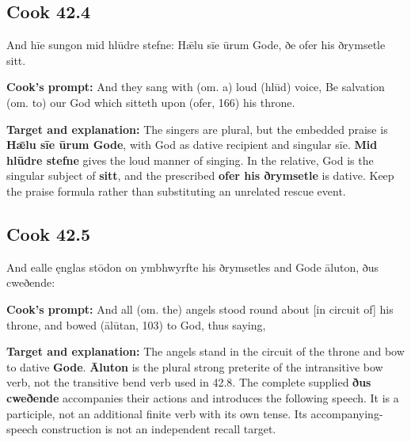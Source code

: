 \par\begin{minipage}{\linewidth}\raggedright
\subsection*{Cook 42.4}

And hīe sungon mid hlūdre stefne: Hǣlu sīe ūrum Gode, ðe ofer his ðrymsetle sitt.

\textbf{Cook's prompt:} And they sang with (om. a) loud (hlūd) voice, Be salvation (om. to) our God which sitteth upon (ofer, 166) his throne.

\textbf{Target and explanation:} The singers are plural, but the embedded praise is \textbf{Hǣlu sīe ūrum Gode}, with God as dative recipient and singular sīe. \textbf{Mid hlūdre stefne} gives the loud manner of singing. In the relative, God is the singular subject of \textbf{sitt}, and the prescribed \textbf{ofer his ðrymsetle} is dative. Keep the praise formula rather than substituting an unrelated rescue event.

\end{minipage}\par\addvspace{4pt}

\par\begin{minipage}{\linewidth}\raggedright
\subsection*{Cook 42.5}

And ealle ęnglas stōdon on ymbhwyrfte his ðrymsetles and Gode āluton, ðus cweðende:

\textbf{Cook's prompt:} And all (om. the) angels stood round about [in circuit of] his throne, and bowed (ālūtan, 103) to God, thus saying,

\textbf{Target and explanation:} The angels stand in the circuit of the throne and bow to dative \textbf{Gode}. \textbf{Āluton} is the plural strong preterite of the intransitive bow verb, not the transitive bend verb used in 42.8. The complete supplied \textbf{ðus cweðende} accompanies their actions and introduces the following speech. It is a participle, not an additional finite verb with its own tense. Its accompanying-speech construction is not an independent recall target.

\end{minipage}\par\addvspace{4pt}

